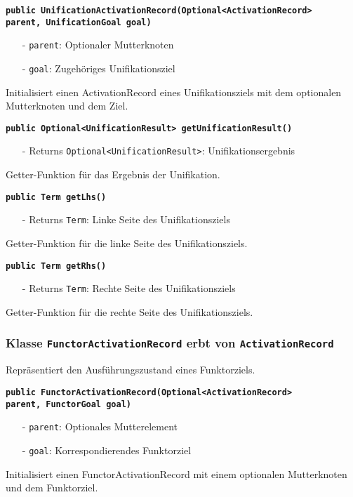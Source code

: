 \documentclass[parskip=full,11pt,twoside]{scrartcl}
\begin{document}
\textbf{\texttt{public UnificationActivationRecord(Optional<ActivationRecord>\\ parent, UnificationGoal goal)}}
\begin{itemize}[noitemsep]
	\item[-] \texttt{parent}: Optionaler Mutterknoten
	\item[-] \texttt{goal}: Zugehöriges Unifikationsziel
\end{itemize}
Initialisiert einen ActivationRecord eines Unifikationsziels mit dem optionalen Mutterknoten und dem Ziel.

\textbf{\texttt{public Optional<UnificationResult> getUnificationResult()}}
\begin{itemize}[noitemsep]
	\item[-] Returns \texttt{Optional<UnificationResult>}: Unifikationsergebnis
\end{itemize}
Getter-Funktion für das Ergebnis der Unifikation.

\textbf{\texttt{public Term getLhs()}}
\begin{itemize}[noitemsep]
	\item[-] Returns \texttt{Term}: Linke Seite des Unifikationsziels
\end{itemize}
Getter-Funktion für die linke Seite des Unifikationsziels.

\textbf{\texttt{public Term getRhs()}}
\begin{itemize}[noitemsep]
	\item[-] Returns \texttt{Term}: Rechte Seite des Unifikationsziels
\end{itemize}
Getter-Funktion für die rechte Seite des Unifikationsziels.

\subsubsection{Klasse \texttt{FunctorActivationRecord} erbt von \texttt{ActivationRecord}}

Repräsentiert den Ausführungszustand eines Funktorziels.

\textbf{\texttt{public FunctorActivationRecord(Optional<ActivationRecord>\\ parent, FunctorGoal goal)}}
\begin{itemize}[noitemsep]
	\item[-] \texttt{parent}: Optionales Mutterelement
	\item[-] \texttt{goal}: Korrespondierendes Funktorziel
\end{itemize}
Initialisiert einen FunctorActivationRecord mit einem optionalen Mutterknoten und dem Funktorziel.
\end{document}
